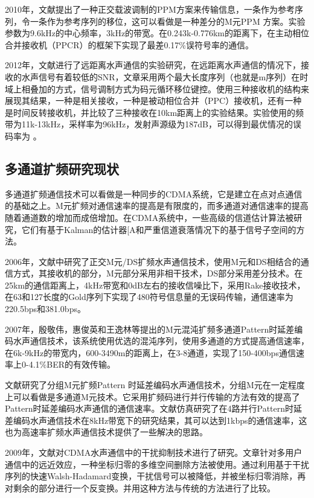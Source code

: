 2010年，文献\cite{zhang2010efficient}提出了一种正交载波调制的PPM方案来传输信息，一条作为参考序列，令一条作为参考序列的移位，这可以看做是一种差分的M元PPM 方案。实验参数为9.6kHz的中心频率，3kHz的带宽。在0.243k-0.776km的距离下，在主动相位合并接收机（PPCR）的框架下实现了最差0.17\%误符号率的通信。

2012年，文献\cite{zhang2012experimental}进行了远距离水声通信的实验研究，在远距离水声通信的情况下，接收的水声信号有着较低的SNR，文章采用两个最大长度序列（也就是m序列）在时域上相叠加的方式，信号调制方式为码元循环移位键控。使用三种接收机的结构来展现其结果，一种是相关接收，一种是被动相位合并（PPC）接收机，还有一种是时间反转接收机，并比较了三种接收在10km距离上的实验结果。实验使用的频带为11k-13kHz，采样率为96kHz，发射声源级为187dB，可以得到最优情况的误码率为 。
\subsection{多通道扩频研究现状}
多通道扩频通信技术可以看做是一种同步的CDMA系统，它是建立在点对点通信的基础之上。M元扩频对通信速率的提高是有限度的，而多通道对通信速率的提高随着通道数的增加而成倍增加。在CDMA系统中，一些高级的信道估计算法被研究，它们有基于Kalman的估计器[A和严重信道衰落情况下的基于信号子空间的方法。

2006年，文献\cite{韩晶2006正交}中研究了正交M元/DS扩频水声通信技术，使用M元和DS相结合的通信方式，其接收机的部分，M元部分采用非相干技术，DS部分采用差分技术。在25km的通信距离上，4kHz带宽和0dB左右的接收信噪比下，采用Rake接收技术，在63和127长度的Gold序列下实现了480符号信息量的无误码传输，通信速率为220.5bps和381.0bps。

2007年，殷敬伟，惠俊英和王逸林等提出的M元混沌扩频多通道Pattern时延差编码水声通信技术，该系统使用优选的混沌序列，使用多通道的方式提高通信速率，在6k-9kHz的带宽内，600-3490m的距离上，在3-8通道，实现了150-400bps通信速率上0-4.1\%BER的有效传输。

文献\cite{惠俊英2008分组}研究了分组M元扩频Pattern 时延差编码水声通信技术，分组M元在一定程度上可以看做是多通道M元技术。它采用扩频码进行并行传输的方法有效的提高了Pattern时延差编码水声通信的通信速率。文献\cite{jing2006underwater}仿真研究了在4路并行Pattern时延差编码水声通信技术在8kHz带宽下的研究结果，其可以达到1kbps的通信速率，这也为高速率扩频水声通信技术提供了一些解决的思路。

2009年，文献\cite{yang2009interference}对CDMA水声通信中的干扰抑制技术进行了研究。文章针对多用户通信中的远近效应，一种坐标归零的多维空间删除方法被使用。通过利用基于干扰序列的快速Walsh-Hadamard变换，干扰信号可以被降低，并被坐标归零消除，再对剩余的部分进行一个反变换。并用这种方法与传统的方法进行了比较。

